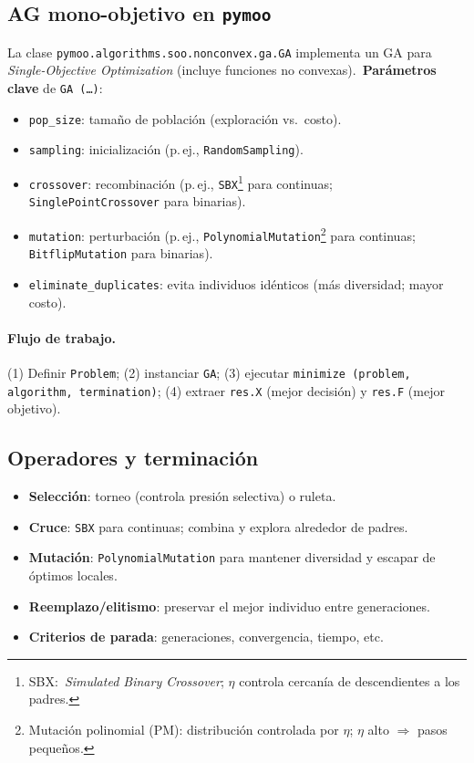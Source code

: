 \subsection{AG mono-objetivo en \texttt{pymoo}}%
\label{subsec:implementacion_ga}
La clase \texttt{pymoo.algorithms.soo.nonconvex.ga.GA} implementa un GA para \emph{Single-Objective Optimization} (incluye funciones no convexas).\ \textbf{Parámetros clave} de \texttt{GA~(\dots)}:
\begin{itemize}
  \item \texttt{pop\_size}: tamaño de población (exploración vs.\ costo).
  \item \texttt{sampling}: inicialización (p.\,ej., \texttt{RandomSampling}).
  \item \texttt{crossover}: recombinación (p.\,ej., \texttt{SBX}\footnote{SBX:\ \emph{Simulated Binary Crossover}; $\eta$ controla cercanía de descendientes a los padres.} para continuas; \texttt{SinglePointCrossover} para binarias).
  \item \texttt{mutation}: perturbación (p.\,ej., \texttt{PolynomialMutation}\footnote{Mutación polinomial (PM): distribución controlada por $\eta$; $\eta$ alto $\Rightarrow$ pasos pequeños.} para continuas; \texttt{BitflipMutation} para binarias).
  \item \texttt{eliminate\_duplicates}: evita individuos idénticos (más diversidad; mayor costo).
\end{itemize}

\paragraph{Flujo de trabajo.}
(1) Definir \texttt{Problem}; (2) instanciar \texttt{GA}; (3) ejecutar \texttt{minimize~(problem, algorithm, termination)}; (4) extraer \texttt{res.X} (mejor decisión) y \texttt{res.F} (mejor objetivo).

\subsection{Operadores y terminación}
\begin{itemize}
  \item \textbf{Selección}: torneo (controla presión selectiva) o ruleta.
  \item \textbf{Cruce}: \texttt{SBX} para continuas; combina y explora alrededor de padres.
  \item \textbf{Mutación}: \texttt{PolynomialMutation} para mantener diversidad y escapar de óptimos locales.
  \item \textbf{Reemplazo/elitismo}: preservar el mejor individuo entre generaciones.
  \item \textbf{Criterios de parada}: generaciones, convergencia, tiempo, etc.
\end{itemize}

